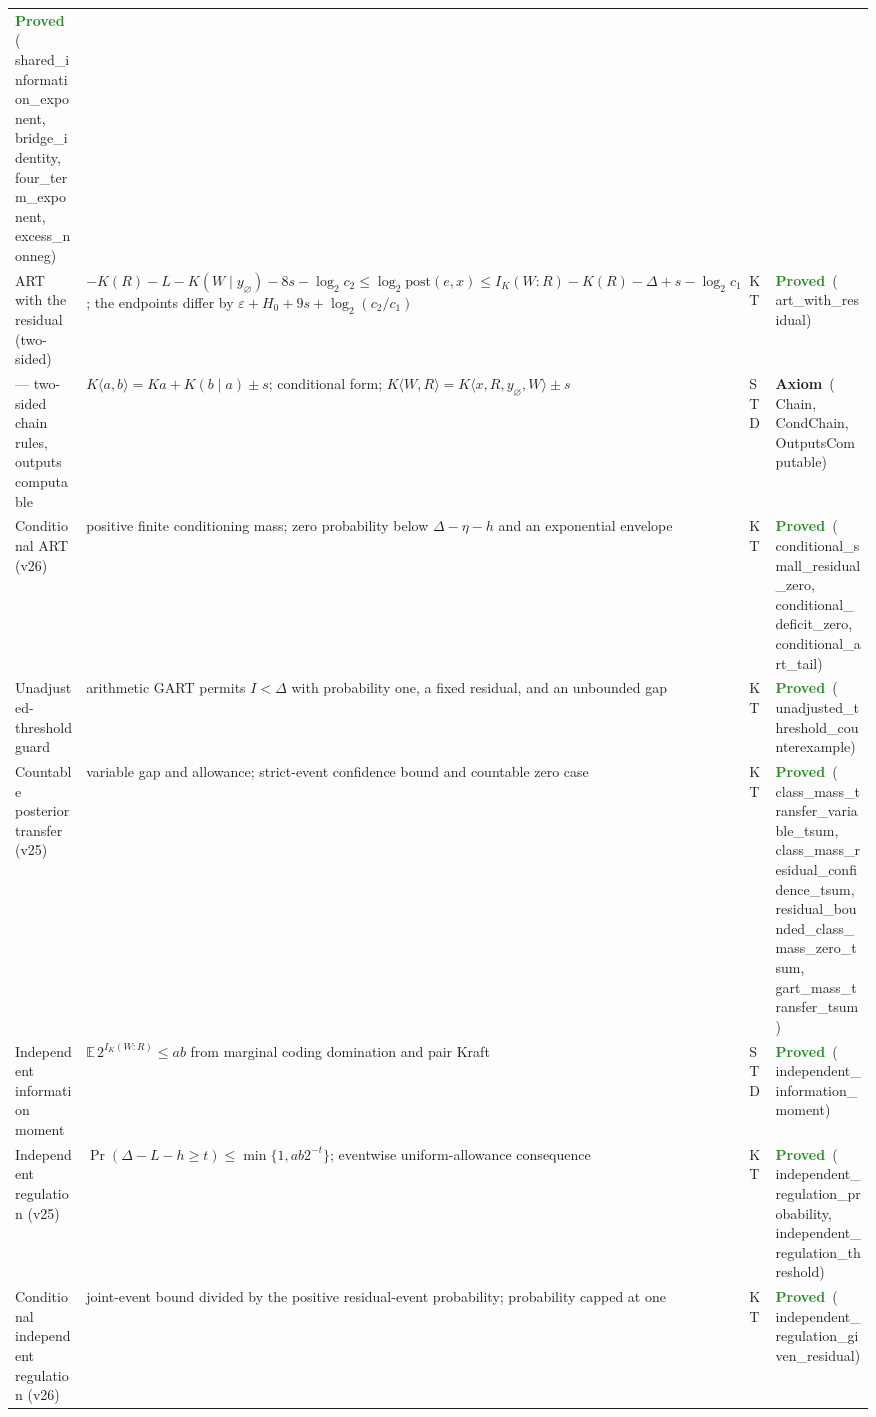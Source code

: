 \documentclass[11pt,a4paper]{article}
\newcommand{\lean}[1]{{\ttfamily\small
  \let\leanunderscore\_\def\_{\leanunderscore\allowbreak}#1}}
\newcommand{\stproved}{\textcolor{ForestGreen}{\textbf{Proved}}}
\newcommand{\staxiom}{\textcolor{bcomblue}{\textbf{Axiom}}}
\begin{document}
{\begin{longtable}{@{}p{2.1cm}p{6.6cm}p{1.0cm}p{2.6cm}@{}}
  \stproved\ (\lean{shared\_\allowbreak information\_\allowbreak exponent}, \lean{bridge\_\allowbreak identity}, \lean{four\_\allowbreak term\_\allowbreak exponent}, \lean{excess\_\allowbreak nonneg}) \\
ART with the residual (two-sided) & $-K(R)-L-K(W\mid y_\varnothing)-8s-\log_2c_2\le\log_2\mathrm{post}(e,x)\le I_K(W{:}R)-K(R)-\Delta+s-\log_2c_1$; the endpoints differ by $\varepsilon+H_0+9s+\log_2(c_2/c_1)$ & KT &
  \stproved\ (\lean{art\_\allowbreak with\_\allowbreak residual}) \\
--- two-sided chain rules, outputs computable & $K\langle a,b\rangle=K a+K(b\mid a)\pm s$; conditional form; $K\langle W,R\rangle=K\langle x,R,y_\varnothing,W\rangle\pm s$ & STD &
  \staxiom\ (\lean{Chain}, \lean{CondChain}, \lean{OutputsComputable}) \\
Conditional ART (v26) & positive finite conditioning mass; zero probability below $\Delta-\eta-h$ and an exponential envelope & KT &
  \stproved\ (\lean{conditional\_\allowbreak small\_residual\_zero}, \lean{conditional\_\allowbreak deficit\_zero}, \lean{conditional\_art\_tail}) \\
Unadjusted-threshold guard & arithmetic GART permits $I<\Delta$ with probability one, a fixed residual, and an unbounded gap & KT &
  \stproved\ (\lean{unadjusted\_threshold\_\allowbreak counter\allowbreak example}) \\
Countable posterior transfer (v25) & variable gap and allowance; strict-event confidence bound and countable zero case & KT &
  \stproved\ (\lean{class\_mass\_transfer\_\allowbreak variable\_tsum}, \lean{class\_mass\_\allowbreak residual\_confidence\_tsum}, \lean{residual\_bounded\_\allowbreak class\_mass\_zero\_tsum}, \lean{gart\_mass\_transfer\_tsum}) \\
Independent information moment & $\mathbb E\,2^{I_K(W:R)}\le ab$ from marginal coding domination and pair Kraft & STD &
  \stproved\ (\lean{independent\_\allowbreak information\_moment}) \\
Independent regulation (v25) & $\Pr(\Delta-L-h\ge t)\le\min\{1,ab2^{-t}\}$; eventwise uniform-allowance consequence & KT &
  \stproved\ (\lean{independent\_regulation\_\allowbreak probability}, \lean{independent\_regulation\_\allowbreak threshold}) \\
Conditional independent regulation (v26) & joint-event bound divided by the positive residual-event probability; probability capped at one & KT &
  \stproved\ (\lean{independent\_regulation\_\allowbreak given\_residual}) \\

\end{longtable}}
\end{document}
